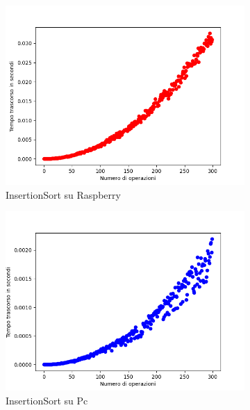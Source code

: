 \documentclass{article}
\begin{document}
			\begin{figure}[h!]
				\centering
				
				\begin{subfigure}{0.6\textwidth}
					\centering
					\includegraphics[width = \textwidth]{./Plots/Raspberry_InsertionSort.png}
					\caption{InsertionSort su Raspberry}
				\end{subfigure}
				\begin{subfigure}{0.6\textwidth}
					\centering
					\includegraphics[width = \textwidth]{./Plots/Pc_InsertionSort.png}
					\caption{InsertionSort su Pc}
				\end{subfigure}
				\begin{subfigure}{0.6\textwidth}
					\centering

\end{subfigure}
\end{figure}
\end{document}
